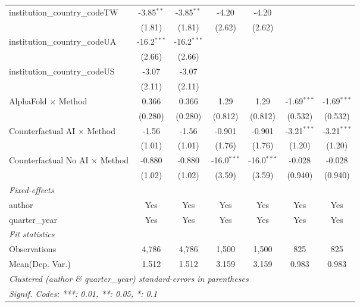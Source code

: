 \begin{tabular}{lcccccc}
   institution\_country\_codeTW          & -3.85$^{**}$  & -3.85$^{**}$  & -4.20         & -4.20         &               &   \\   
                                         & (1.81)        & (1.81)        & (2.62)        & (2.62)        &               &   \\   
   institution\_country\_codeUA          & -16.2$^{***}$ & -16.2$^{***}$ &               &               &               &   \\   
                                         & (2.66)        & (2.66)        &               &               &               &   \\   
   institution\_country\_codeUS          & -3.07         & -3.07         &               &               &               &   \\   
                                         & (2.11)        & (2.11)        &               &               &               &   \\   
   AlphaFold $\times$ Method             & 0.366         & 0.366         & 1.29          & 1.29          & -1.69$^{***}$ & -1.69$^{***}$\\   
                                         & (0.280)       & (0.280)       & (0.812)       & (0.812)       & (0.532)       & (0.532)\\   
   Counterfactual AI $\times$ Method     & -1.56         & -1.56         & -0.901        & -0.901        & -3.21$^{***}$ & -3.21$^{***}$\\   
                                         & (1.01)        & (1.01)        & (1.76)        & (1.76)        & (1.20)        & (1.20)\\   
   Counterfactual No AI $\times$ Method  & -0.880        & -0.880        & -16.0$^{***}$ & -16.0$^{***}$ & -0.028        & -0.028\\   
                                         & (1.02)        & (1.02)        & (3.59)        & (3.59)        & (0.940)       & (0.940)\\   
   \midrule
   \emph{Fixed-effects}\\
   author                                & Yes           & Yes           & Yes           & Yes           & Yes           & Yes\\  
   quarter\_year                         & Yes           & Yes           & Yes           & Yes           & Yes           & Yes\\  
   \midrule
   \emph{Fit statistics}\\
   Observations                          & 4,786         & 4,786         & 1,500         & 1,500         & 825           & 825\\  
Mean(Dep. Var.) & 1.512 & 1.512 & 3.159 & 3.159 & 0.983 & 0.983 \\
   \midrule \midrule
   \multicolumn{7}{l}{\emph{Clustered (author \& quarter\_year) standard-errors in parentheses}}\\
   \multicolumn{7}{l}{\emph{Signif. Codes: ***: 0.01, **: 0.05, *: 0.1}}\\
\end{tabular}
\par\endgroup
